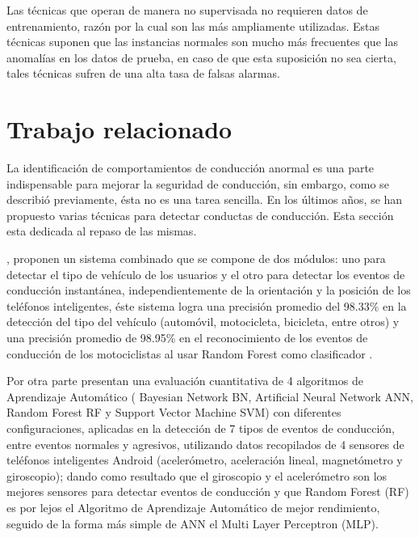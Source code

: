 Las t\'{e}cnicas que operan de manera no supervisada no requieren datos de entrenamiento, raz\'{o}n por la cual son las m\'{a}s ampliamente utilizadas. Estas t\'{e}cnicas suponen que las instancias normales son mucho m\'{a}s frecuentes que  las anomal\'{i}as en los datos de prueba, en caso de que esta suposici\'{o}n no sea cierta, tales t\'{e}cnicas sufren de una alta tasa de falsas alarmas.

\section{Trabajo relacionado}

La identificación de comportamientos de conducción anormal es una parte indispensable para mejorar la seguridad de conducción, sin embargo, como se describi\'{o} previamente, \'{e}sta no es una tarea sencilla. En los últimos años, se han propuesto varias técnicas para detectar conductas de conducci\'{o}n. Esta secci\'{o}n esta dedicada al repaso de las mismas.

\vspace{5mm} %

, proponen un sistema combinado que se compone de dos módulos: uno para detectar el tipo de vehículo de los usuarios y el otro para detectar los eventos de conducción instantánea, independientemente de la orientación y la posición de los teléfonos inteligentes, \'{e}ste sistema logra una precisión promedio del 98.33\% en la detección del tipo del vehículo (autom\'{o}vil, motocicleta, bicicleta, entre otros) y una precisión promedio de 98.95\% en el reconocimiento de los eventos de conducción de los motociclistas al usar Random Forest como clasificador .

\vspace{5mm} %

Por otra parte  presentan una evaluación cuantitativa de 4 algoritmos de Aprendizaje Autom\'{a}tico ( Bayesian Network BN, Artificial Neural Network ANN, Random Forest RF y Support Vector Machine SVM) con diferentes configuraciones, aplicadas en la detección de 7 tipos de eventos de conducción, entre eventos normales y agresivos, utilizando datos recopilados de 4 sensores de teléfonos inteligentes Android (acelerómetro, aceleración lineal, magnetómetro y giroscopio); dando como resultado que el giroscopio y el acelerómetro son los mejores sensores para detectar eventos de conducción y que Random Forest (RF) es por lejos el Algoritmo de Aprendizaje Autom\'{a}tico de mejor rendimiento, seguido de la forma m\'{a}s simple de ANN el Multi Layer Perceptron (MLP).

